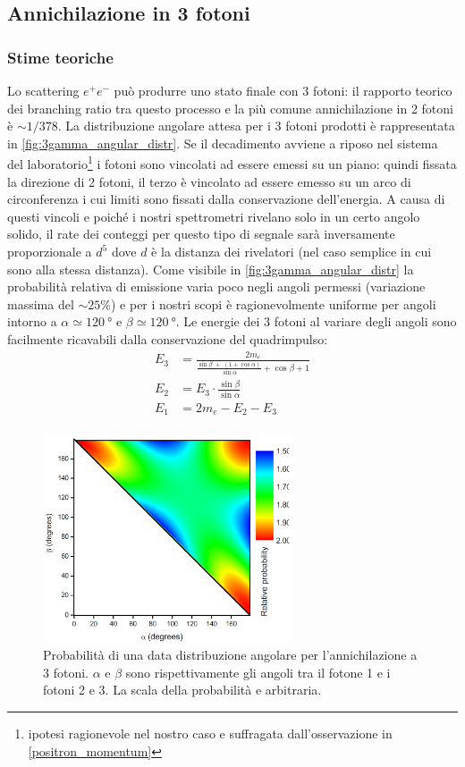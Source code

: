 \subsection{Annichilazione in 3 fotoni}

\subsubsection{Stime teoriche}
Lo scattering $e^+e^-$ può produrre uno stato finale con 3 fotoni: il rapporto teorico dei branching ratio tra questo processo e la più comune annichilazione in 2 fotoni è $\sim 1/378$\cite{3gamma}. La distribuzione angolare attesa per i 3 fotoni prodotti è rappresentata in \autoref{fig:3gamma_angular_distr}. Se il decadimento avviene a riposo nel sistema del laboratorio\footnote{ipotesi ragionevole nel nostro caso e suffragata dall'osservazione in \autoref{positron_momentum}} i fotoni sono vincolati ad essere emessi su un piano: quindi fissata la direzione di 2 fotoni, il terzo è vincolato ad essere emesso su un arco di circonferenza i cui limiti sono fissati dalla conservazione dell'energia. A causa di questi vincoli e poiché i nostri spettrometri rivelano solo in un certo angolo solido, il rate dei conteggi per questo tipo di segnale sarà inversamente proporzionale a $d^5$ dove $d$ è la distanza dei rivelatori (nel caso semplice in cui sono alla stessa distanza).
Come visibile in \autoref{fig:3gamma_angular_distr} la probabilità relativa di emissione varia poco negli angoli permessi (variazione massima del $\sim 25\%$) e per i nostri scopi è ragionevolmente uniforme per angoli intorno a $\alpha\simeq \SI{120}{\degree}$ e $\beta\simeq\SI{120}{\degree}$.
Le energie dei 3 fotoni al variare degli angoli sono facilmente ricavabili dalla conservazione del quadrimpulso:
\begin{align*}
\label{eq:3gamma_energy}
E_3 &= \frac{2 m_e}{\frac{\sin\beta \;+\;(1+\cos\alpha)}{\sin\alpha}+\cos\beta+1}\\
E_2 &= E_3 \cdot \frac{\sin\beta}{\sin\alpha}\\
E_1 &= 2m_e - E_2 - E_3\\
\end{align*}

\begin{figure}[h]
	\centering
	\includegraphics[width=20em]{immagini/3gamma_distribution}
	\caption{\label{fig:3gamma_angular_distr}Probabilità di una data distribuzione angolare per l'annichilazione a 3 fotoni. $\alpha$ e $\beta$ sono rispettivamente gli angoli tra il fotone 1 e i fotoni 2 e 3. La scala della probabilità e arbitraria.}
\end{figure}

